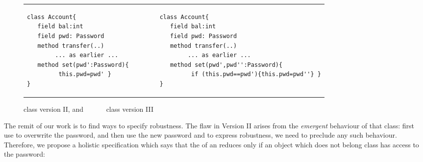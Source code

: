 %
  
  
 
 \begin{figure}[hbtp]
 \begin{tabular}{lll}
\begin{minipage}{0.35\textwidth}
\begin{lstlisting}
class Account{
   field bal:int 
   field pwd: Password 
   method transfer(..) 
        ... as earlier ...
   method set(pwd':Password){
         this.pwd=pwd' }
}   
\end{lstlisting}
\end{minipage}
  &\ \ \  \ \   &
\begin{minipage}{0.50\textwidth}
\begin{lstlisting}
class Account{
   field bal:int 
   field pwd: Password 
   method transfer(..) 
        ... as earlier ...
   method set(pwd',pwd'':Password){
         if (this.pwd==pwd'){this.pwd=pwd''} }
}
\end{lstlisting}
\end{minipage} 
 \end{tabular}
  \caption{class  version II, and \ \ \ \ \ \  class  version III}
 \label{fig:ExampleAccount}
 \end{figure}

 
 The remit of our work is to find ways to specify robustness. 
 The flaw in Version II arises from the \emph{emergent} behaviour of that class: first use  
 to overwrite the
 password, and then use the new password and    
 to express robustness, we need to preclude any such behaviour.
 Therefore, we propose a holistic specification which says that
 the  of an  reduces only if an object which does not belong
 class  has access to the password:
 

